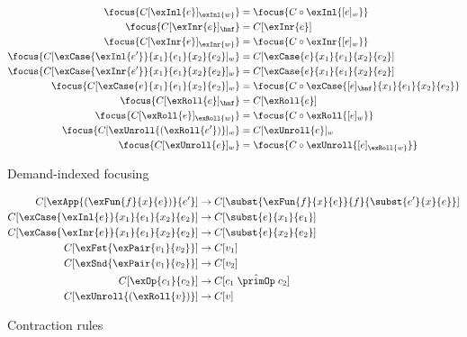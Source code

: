 \begin{figure*}
\begin{align*}
\focus{C[\exInl{e}]_{\exInl{w}}}
& =
\focus{C \circ \exInl{[e]_{w}}}
\\
\focus{C[\exInr{e}]_{\hnf}}
& =
C[\exInr{e}]
\\
\focus{C[\exInr{e}]_{\exInr{w}}}
& =
\focus{C \circ \exInr{[e]_{w}}}
\\
\focus{C[\exCase{\exInl{e'}}{x_1}{e_1}{x_2}{e_2}]_{w}}
& =
C[\exCase{e}{x_1}{e_1}{x_2}{e_2}]
\\
\focus{C[\exCase{\exInr{e'}}{x_1}{e_1}{x_2}{e_2}]_{w}}
& =
C[\exCase{e}{x_1}{e_1}{x_2}{e_2}]
\\
\focus{C[\exCase{e}{x_1}{e_1}{x_2}{e_2}]_{w}}
& =
\focus{C \circ \exCase{[e]_{\hnf}}{x_1}{e_1}{x_2}{e_2}}
\\
\focus{C[\exRoll{e}]_{\hnf}}
& =
C[\exRoll{e}]
\\
\focus{C[\exRoll{e}]_{\exRoll{w}}}
& =
\focus{C \circ \exRoll{[e]_{w}}}
\\
\focus{C[\exUnroll{(\exRoll{e'})}]_{w}}
& = 
C[\exUnroll{e}]_{w}
\\
\focus{C[\exUnroll{e}]_{w}}
& = 
\focus{C \circ \exUnroll{[e]_{\exRoll{w}}}}
\end{align*}
\caption{Demand-indexed focusing}
\end{figure*}

\begin{figure*}
\begin{align*}
C[\exApp{(\exFun{f}{x}{e})}{e'}]
&
\rightarrow
C[\subst{\exFun{f}{x}{e}}{f}{\subst{e'}{x}{e}}]
\\
C[\exCase{\exInl{e}}{x_1}{e_1}{x_2}{e_2}]
&
\rightarrow
C[\subst{e}{x_1}{e_1}]
\\
C[\exCase{\exInr{e
}}{x_1}{e_1}{x_2}{e_2}]
&
\rightarrow
C[\subst{e}{x_2}{e_2}]
\\
C[\exFst{\exPair{v_1}{v_2}}]
&
\rightarrow
C[v_1]
\\
C[\exSnd{\exPair{v_1}{v_2}}]
&
\rightarrow
C[v_2]
\\
C[\exOp{{c_1}}{{c_2}}]
&
\rightarrow
C[c_1\;\hat{\primOp}\;c_2]
\\
C[\exUnroll{(\exRoll{v})}]
&
\rightarrow
C[v]
\end{align*}
\caption{Contraction rules}
\end{figure*}
